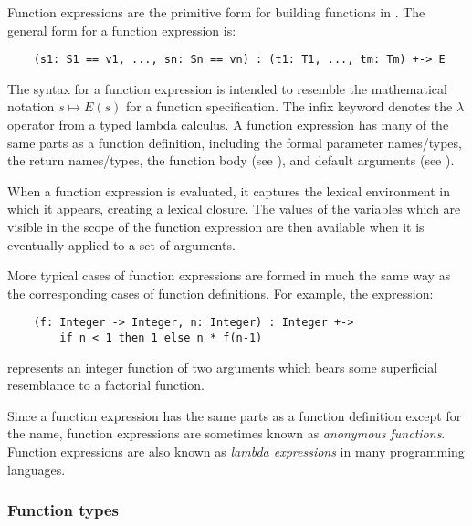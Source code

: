 Function expressions are the primitive form for building functions
in \asharp{}.  The general form for a function expression is:

\begin{small}
\begin{verbatim}
    (s1: S1 == v1, ..., sn: Sn == vn) : (t1: T1, ..., tm: Tm) +-> E
\end{verbatim}
\end{small}

The syntax  for a function expression
is intended to resemble the mathematical notation $s \mapsto E(s)$
for a function specification.  The infix keyword \ttin{+->}
denotes the $\lambda$ operator from a typed lambda calculus.
A function expression has many of the same parts as a function definition,
including the formal parameter names/types, the return names/types,
the function body (see ), and
default arguments (see ).

When a function expression is evaluated, it captures the lexical environment
in which it appears, creating a lexical closure.  The values of the variables
which are visible in the scope of the function expression are then available
when it is eventually applied to a set of arguments.

More typical cases of function expressions are formed in much the same
way as the corresponding cases of function definitions.  For example,
the expression:

\begin{small}
\begin{verbatim}
    (f: Integer -> Integer, n: Integer) : Integer +->
        if n < 1 then 1 else n * f(n-1)
\end{verbatim}
\end{small}

represents an integer function of two arguments which bears some superficial
resemblance to a factorial function.

Since a function expression has the same parts as a function
definition except for the name, function expressions are sometimes
known as {\em anonymous functions\/}.
Function expressions are also known as {\em lambda expressions\/}
in many programming languages.

\subsubsection{Function types}


